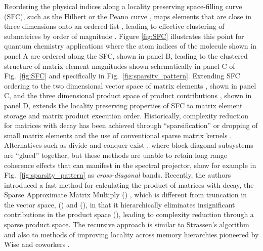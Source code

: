 Reordering the physical indices  along a locality preserving
space-filling curve (SFC), such as the Hilbert \cite{HilberCurve} or the Peano
curve \cite{peano1890courbe}, maps elements that are close in three dimensions
onto an ordered list \cite{Warren:1992:HOT, Warren:1995:HOTb,
Samet:2006:DBDS}, leading to effective clustering of submatrices by order of
magnitude \cite{Challacombe:2000:SpMM}.  Figure \ref{fig:SFC} illustrates this
point for quantum chemistry applications where the atom indices of the
molecule shown in panel A are ordered along the SFC, shown in panel B, leading
to the clustered structure of matrix element magnitudes shown schematically in
panel C of Fig.~\ref{fig:SFC} and specifically in
Fig.~\ref{fig:sparsity_pattern}.  Extending SFC ordering to the two
dimensional vector space of matrix elements , shown in panel C, and
the three dimensional product space of product contributions ,
shown in panel D, extends the locality preserving properties of SFC to matrix
element storage and matrix product execution order. Historically, complexity
reduction for matrices with decay has been achieved through ``sparsification''
or dropping of small matrix elements and the use of conventional sparse matrix
kernels \cite{Galli:1996:ONREV, Goedecker98, Goedecker:1999:ONREV,
0953-8984-14-11-303, Goedecker:2003:ONREV, Li:2005:ONREV, bowler2011:ONREV}.
Alternatives such as divide and conquer exist \cite{yang1991direct,
yang1995density, lee1998linear, Nakano2007642}, where block diagonal
subsystems are ``glued'' together, but these methods are unable to retain long
range coherence effects that can manifest in the spectral projector, show for
example in Fig.~\ref{fig:sparsity_pattern} as \emph{cross-diagonal} bands.
Recently, the authors introduced a fast method for calculating the product of
matrices with decay, the Sparse Approximate Matrix Multiply (\SpAMM{})
\cite{ChallacombeBock2010}, which is different from truncation in the vector
space, () and (), in that it hierarchically eliminates insignificant
contributions in the product space (), leading to complexity reduction
through a sparse product space.  The recursive approach is similar to
Strassen's algorithm \cite{springerlink:10.1007/BF02165411} and also to
methods of improving locality across memory hierarchies pioneered by Wise and
coworkers \cite{Frens:1997:AMT:263767.263789, Wise:2001:LSM:568014.379559,
Lorton:2006:ABL:1166133.1166134, Wise1990282,
springerlink:10.1007/3-540-51084-2_9, Wise:1984:RMQ:1089389.1089398,
Wise:Ahnentafel}.

